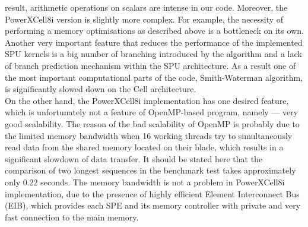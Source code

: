 result, arithmetic operations on scalars are intense in our code.
Moreover, the PowerXCell8i version is slightly more complex.
For example, the necessity of performing a memory optimisations as described above is a bottleneck on its own.
Another very important feature that reduces the performance of the implemented SPU
kernels is a big number of branching introduced by the algorithm and a lack of
branch prediction mechanism within the SPU architecture.
As a result one of the most important computational parts of the code,
Smith-Waterman algorithm, is significantly slowed down on the Cell architecture.\\
On the other hand, the PowerXCell8i implementation has one desired feature, which
is unfortunately not a feature of OpenMP-based program, namely --- very good
scalability.
The reason of the bad scalability of OpenMP is probably due to the limited memory bandwidth when 16 working threads try to simultaneously read data from the shared memory
located on their blade, which results in a significant slowdown of data
transfer.
It should be stated here that the comparison of two longest sequences in the
benchmark test takes approximately only 0.22 seconds.
The memory bandwidth  is not a problem in PowerXCell8i implementation, due to
the presence of highly efficient Element Interconnect Bus (EIB), which provides
each SPE and its memory controller with private and very fast connection to the
main memory.

